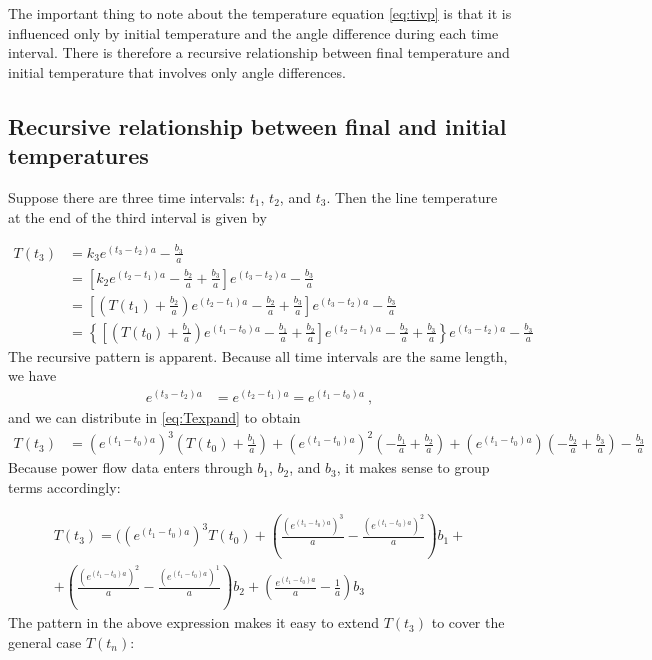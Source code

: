 \documentclass[conference]{IEEEtran}
\begin{document}
The important thing to note about the temperature equation \eqref{eq:tivp} is that it is influenced only by initial temperature and the angle difference during each time interval. There is therefore a recursive relationship between final temperature and initial temperature that involves only angle differences.

\subsection{Recursive relationship between final and initial temperatures}
Suppose there are three time intervals: $t_1$, $t_2$, and $t_3$. Then the line temperature at the end of the third interval is given by

\begin{align}
\nonumber T(t_3) &= k_3 e^{(t_3-t_2)a} - \frac{b_3}{a} \\
\nonumber &= \left[k_2 e^{(t_2-t_1)a} - \frac{b_2}{a} + \frac{b_3}{a}\right]e^{(t_3-t_2)a} - \frac{b_3}{a} \\
\nonumber &= \left[\left( T(t_1) + \frac{b_2}{a} \right)e^{(t_2-t_1)a} - \frac{b_2}{a} + \frac{b_3}{a}\right]e^{(t_3-t_2)a} - \frac{b_3}{a} \\
\label{eq:Texpand} &= \left\lbrace\left[\left(T(t_0) + \frac{b_1}{a}\right) e^{(t_1-t_0)a} - \frac{b_1}{a} + \frac{b_2}{a}\right]e^{(t_2-t_1)a} - \frac{b_2}{a} + \frac{b_3}{a}\right\rbrace e^{(t_3-t_2)a} - \frac{b_3}{a}
\end{align}
The recursive pattern is apparent. Because all time intervals are the same length, we have
\begin{align*}
e^{(t_3-t_2)a} &= e^{(t_2-t_1)a} = e^{(t_1-t_0)a}~,
\end{align*}
and we can distribute in \eqref{eq:Texpand} to obtain
\begin{align}
T(t_3) &= (e^{(t_1-t_0)a})^3\left(T(t_0) + \frac{b_1}{a}\right) + (e^{(t_1-t_0)a})^2\left(- \frac{b_1}{a} + \frac{b_2}{a}\right) + (e^{(t_1-t_0)a})\left(- \frac{b_2}{a} + \frac{b_3}{a}\right) - \frac{b_3}{a}
\end{align}
Because power flow data enters through $b_1$, $b_2$, and $b_3$, it makes sense to
group terms accordingly:

\begin{multline}
T(t_3) = ((e^{(t_1-t_0)a})^3T(t_0) + \left(\frac{(e^{(t_1-t_0)a})^3}{a} - \frac{(e^{(t_1-t_0)a})^2}{a}\right)b_1 + \\ + \left( \frac{(e^{(t_1-t_0)a})^2}{a} - \frac{(e^{(t_1-t_0)a})^1}{a}\right)b_2 + \left(\frac{e^{(t_1-t_0)a}}{a} - \frac{1}{a}\right) b_3
\end{multline}
The pattern in the above expression makes it easy to extend $T(t_3)$ to cover the general case $T(t_n)$:
\end{document}
